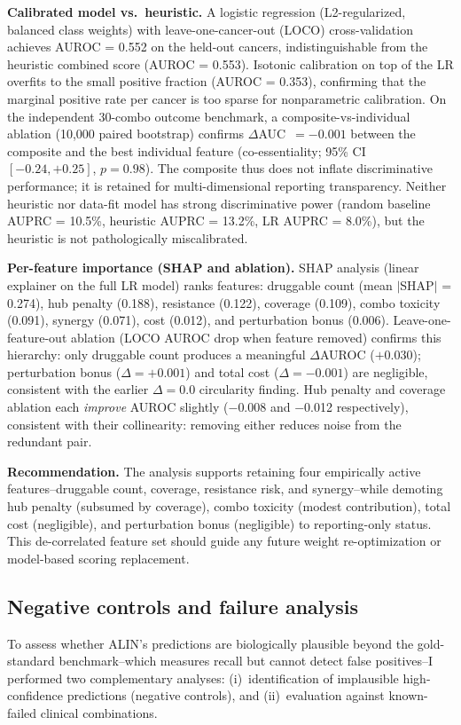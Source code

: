 \documentclass[11pt]{article}
\begin{document}
\textbf{Calibrated model vs.\ heuristic.} A logistic regression (L2-regularized, balanced class weights) with leave-one-cancer-out (LOCO) cross-validation achieves AUROC = 0.552 on the held-out cancers, indistinguishable from the heuristic combined score (AUROC = 0.553). Isotonic calibration on top of the LR overfits to the small positive fraction (AUROC = 0.353), confirming that the marginal positive rate per cancer is too sparse for nonparametric calibration. On the independent 30-combo outcome benchmark, a composite-vs-individual ablation (10{,}000 paired bootstrap) confirms $\Delta$AUC~$= -0.001$ between the composite and the best individual feature (co-essentiality; 95\% CI~$[-0.24, +0.25]$, $p = 0.98$). The composite thus does not inflate discriminative performance; it is retained for multi-dimensional reporting transparency. Neither heuristic nor data-fit model has strong discriminative power (random baseline AUPRC = 10.5\%, heuristic AUPRC = 13.2\%, LR AUPRC = 8.0\%), but the heuristic is not pathologically miscalibrated.

\textbf{Per-feature importance (SHAP and ablation).} SHAP analysis (linear explainer on the full LR model) ranks features: druggable count (mean $|$SHAP$|$ = 0.274), hub penalty (0.188), resistance (0.122), coverage (0.109), combo toxicity (0.091), synergy (0.071), cost (0.012), and perturbation bonus (0.006). Leave-one-feature-out ablation (LOCO AUROC drop when feature removed) confirms this hierarchy: only druggable count produces a meaningful $\Delta$AUROC ($+$0.030); perturbation bonus ($\Delta = +0.001$) and total cost ($\Delta = -0.001$) are negligible, consistent with the earlier $\Delta = 0.0$ circularity finding. Hub penalty and coverage ablation each \emph{improve} AUROC slightly ($-$0.008 and $-$0.012 respectively), consistent with their collinearity: removing either reduces noise from the redundant pair.

\textbf{Recommendation.} The analysis supports retaining four empirically active features--druggable count, coverage, resistance risk, and synergy--while demoting hub penalty (subsumed by coverage), combo toxicity (modest contribution), total cost (negligible), and perturbation bonus (negligible) to reporting-only status. This de-correlated feature set should guide any future weight re-optimization or model-based scoring replacement.

\subsection{Negative controls and failure analysis}
\label{sec:negative_controls}
To assess whether ALIN's predictions are biologically plausible beyond the gold-standard benchmark--which measures recall but cannot detect false positives--I performed two complementary analyses: (i)~identification of implausible high-confidence predictions (negative controls), and (ii)~evaluation against known-failed clinical combinations.
\end{document}
